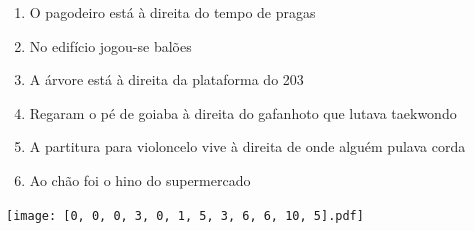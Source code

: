 \documentclass[12pt]{article}
\begin{document}
		 

\pagebreak


	\begin{enumerate}
		  \sffamily %
		  \large %


\vfill \item
O pagodeiro está	%
à direita
do tempo de pragas	%

\vfill \item
No edifício	%
jogou-se balões	%

\vfill \item
A árvore está	%
à direita
da plataforma do 203	%

\vfill \item
Regaram o pé de goiaba	%
à direita
do gafanhoto que lutava taekwondo	%

\vfill \item
A partitura para violoncelo vive	%
à direita
de onde alguém pulava corda	%

\vfill \item
Ao chão foi	%
o hino do supermercado	%
	\end{enumerate}
		  
		  \hfill

		  \vfill

\texttt{[image: [0, 0, 0, 3, 0, 1, 5, 3, 6, 6, 10, 5].pdf]}


	\hfill	  	  


\pagebreak			
\end{document}
